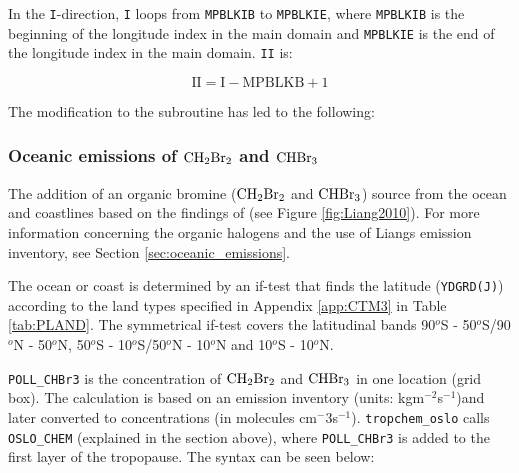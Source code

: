\medskip

In the \texttt{I}-direction, \texttt{I} loops from \texttt{MPBLKIB} to \texttt{MPBLKIE}, where \texttt{MPBLKIB} is the beginning of the longitude index in the main domain and \texttt{MPBLKIE} is the end of the longitude index in the main domain. \texttt{II} is: 

\begin{equation*}
    \text{II} = \text{I} - \text{MPBLKB} + 1
\end{equation*}

\medskip

The modification to the subroutine has led to the following: 


\subsubsection{Oceanic emissions of $\mathrm{CH_2Br_2}$ and $\mathrm{CHBr_3}$}\label{sec:impl_ocean_source}

The addition of an organic bromine ($\mathrm{CH_2Br_2}$ and $\mathrm{CHBr_3}$) source from the ocean and coastlines based on the findings of \cite{Liang2010} (see Figure \ref{fig:Liang2010}). For more information concerning the organic halogens and the use of Liangs emission inventory, see Section \ref{sec:oceanic_emissions}.

\medskip

The ocean or coast is determined by an if-test that finds the latitude (\texttt{YDGRD(J)}) according to the land types specified in Appendix \ref{app:CTM3} in Table \ref{tab:PLAND}. The symmetrical if-test covers the latitudinal bands 90$^o$S - 50$^o$S/90$^o$N - 50$^o$N, 50$^o$S - 10$^o$S/50$^o$N - 10$^o$N and 10$^o$S - 10$^o$N. 

\medskip

\texttt{POLL\_CHBr3} is the concentration of $\mathrm{CH_2Br_2}$ and $\mathrm{CHBr_3}$ in one location (grid box). The calculation is based on an emission inventory  (units: kgm$^{-2}$s$^{-1}$)and later converted to concentrations (in molecules cm$^-{3}$s$^{-1}$). \texttt{tropchem\_oslo} calls \texttt{OSLO\_CHEM} (explained in the section above), where \texttt{POLL\_CHBr3} is added to the first layer of the tropopause. The syntax can be seen below:


